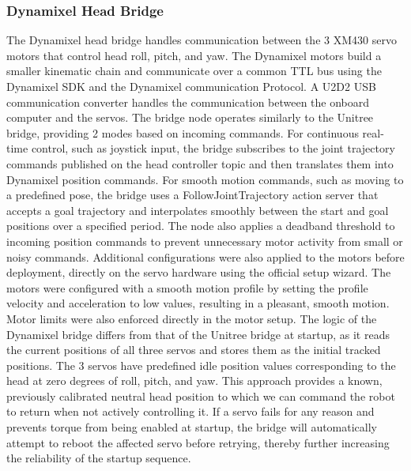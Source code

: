 \subsubsection*{Dynamixel Head Bridge}
The Dynamixel head bridge handles communication between the 3 XM430 servo motors that control head roll, pitch, and yaw. The Dynamixel motors build a smaller kinematic chain and communicate over a common TTL bus using the Dynamixel SDK and the Dynamixel communication Protocol. A U2D2 USB communication converter handles the communication between the onboard computer and the servos. 
The bridge node operates similarly to the Unitree bridge, providing 2 modes based on incoming commands. For continuous real-time control, such as joystick input, the bridge subscribes to the joint trajectory commands published on the head controller topic and then translates them into Dynamixel position commands. For smooth motion commands, such as moving to a predefined pose, the bridge uses a FollowJointTrajectory action server that accepts a goal trajectory and interpolates smoothly between the start and goal positions over a specified period.
The node also applies a deadband threshold to incoming position commands to prevent unnecessary motor activity from small or noisy commands. Additional configurations were also applied to the motors before deployment, directly on the servo hardware using the official setup wizard. The motors were configured with a smooth motion profile by setting the profile velocity and acceleration to low values, resulting in a pleasant, smooth motion. Motor limits were also enforced directly in the motor setup.
The logic of the Dynamixel bridge differs from that of the Unitree bridge at startup, as it reads the current positions of all three servos and stores them as the initial tracked positions. The 3 servos have predefined idle position values corresponding to the head at zero degrees of roll, pitch, and yaw. This approach provides a known, previously calibrated neutral head position to which we can command the robot to return when not actively controlling it. If a servo fails for any reason and prevents torque from being enabled at startup, the bridge will automatically attempt to reboot the affected servo before retrying, thereby further increasing the reliability of the startup sequence.


